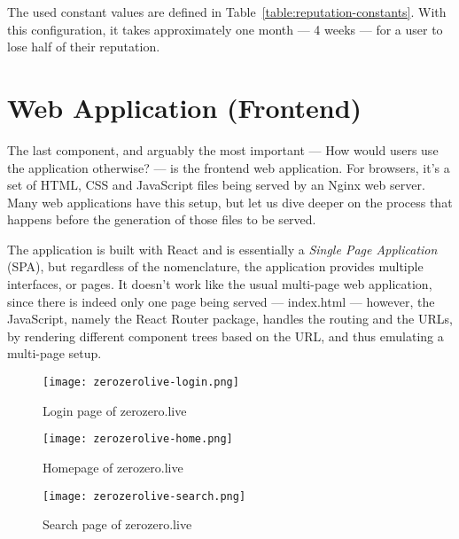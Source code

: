 The used constant values are defined in Table~\ref{table:reputation-constants}. With this configuration, it takes approximately one month --- 4 weeks --- for a user to lose half of their reputation.

\section{Web Application (Frontend)}

The last component, and arguably the most important --- How would users use the application otherwise? --- is the frontend web application. For browsers, it's a set of HTML, CSS and JavaScript files being served by an Nginx web server. Many web applications have this setup, but let us dive deeper on the process that happens before the generation of those files to be served.

The application is built with React and is essentially a \textit{Single Page Application} (SPA), but regardless of the nomenclature, the application provides multiple interfaces, or pages. It doesn't work like the usual multi-page web application, since there is indeed only one page being served --- index.html --- however, the JavaScript, namely the React Router package, handles the routing and the URLs, by rendering different component trees based on the URL, and thus emulating a multi-page setup.

\begin{figure}[h]
    \begin{center}
        \leavevmode
        \texttt{[image: zerozerolive-login.png]}
        \caption{Login page of zerozero.live}
        \label{fig:zerozerolive-login}
    \end{center}
\end{figure}

\begin{figure}[h]
    \begin{center}
        \leavevmode
        \texttt{[image: zerozerolive-home.png]}
        \caption{Homepage of zerozero.live}
        \label{fig:zerozerolive-home}
    \end{center}
\end{figure}

\begin{figure}[h]
    \begin{center}
        \leavevmode
        \texttt{[image: zerozerolive-search.png]}
        \caption{Search page of zerozero.live}
        \label{fig:zerozerolive-search}
    \end{center}
\end{figure}

